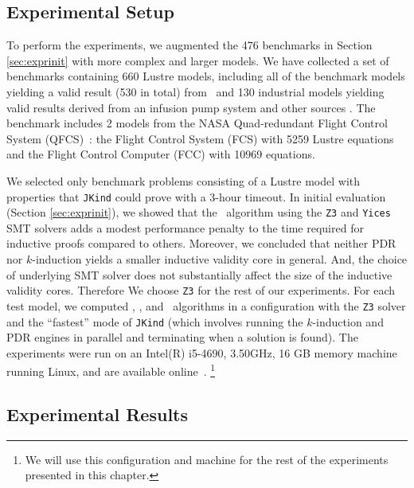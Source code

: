 \subsection{Experimental Setup}
\label{sec:expsetup}
To perform the experiments, we augmented the 476 benchmarks in Section \ref{sec:exprinit} with more complex and larger models. We have collected a set of benchmarks containing 660 Lustre models, including all of the benchmark models yielding a valid result (530 in total) from~\cite{Hagen08:FMCAD, piskac2016} and 130 industrial models yielding valid results derived from an infusion pump system \cite{hilt2013} and other sources \cite{piskac2016, NFM2015:backes}.
The benchmark includes 2 models from the NASA Quad-redundant Flight Control System (QFCS)~\cite{NFM2015:backes}: the Flight Control System (FCS) with 5259 Lustre equations and the Flight Control Computer (FCC) with 10969 equations.

We selected only benchmark problems consisting of a Lustre model with
properties that \texttt{JKind} could prove with a 3-hour timeout.
In initial evaluation (Section \ref{sec:exprinit}), we showed that the \ucalg\ algorithm using the \texttt{Z3} and \texttt{Yices} SMT solvers adds
a modest performance penalty to the time required for inductive
proofs compared to others.
Moreover, we concluded that neither PDR nor $k$-induction yields a smaller inductive
validity core in general. And, the choice of underlying SMT solver does
not substantially affect the size of the inductive validity cores. Therefore We choose \texttt{Z3} for the rest of our experiments.
For each test model, we computed \aivcalg, \ucalg, and \ucbfalg ~algorithms in a configuration with the \texttt{Z3} solver and the ``fastest'' mode of \texttt{JKind} (which involves running the $k$-induction and PDR engines in parallel and terminating when a solution is found). The experiments were run on an  Intel(R) i5-4690, 3.50GHz, 16 GB memory machine running Linux, and are available online~\cite{expr}. \footnote{We will use this configuration and machine for the rest of the experiments presented in this chapter.}


\subsection{Experimental Results}
\label{subsec:res}
